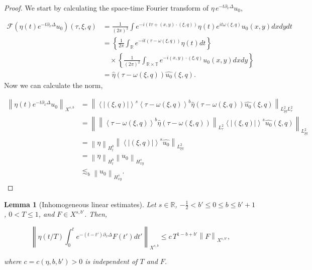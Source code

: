 \documentclass[12pt,oneside,reqno]{amsart}
\numberwithin{equation}{section}
\theoremstyle{plain}
\newtheorem{lemma}[theorem]{Lemma}
\def\R{{\mathbb R}}
\def\T{{\mathbb T}}
\newcommand{\norm}[1]{%
    \left\lVert #1\right\rVert%
}
\newcommand{\inp}[1]{%
    \left\langle #1\right\rangle
}
\newcommand{\brs}[1]{%
    \left\{#1\right\}
}
\def\pt{\partial}
\newcommand{\Lptxy}[3]{%
    \left\lVert #1\right\rVert_{L^{#2}_{#3}}%
}
\newcommand{\xnorm}[3]{%
    \left\lVert #1\right\rVert_{X^{{#2},{#3}}}%
}
\newcommand{\F}{\mathcal{F}}
\newcommand{\Fh}[1]{\widehat{#1}}
\newcommand{\sg}[1]{%
    e^{#1\partial_x\Delta}%
}
\begin{document}
\begin{proof}
    We start by calculating the space-time Fourier transform of $\eta\, \sg{-t} u_0$, 


    \begin{align*}
        \F {\left({\eta(t) \sg{-t} u_0}\right)}(\tau, \xi,q) &= \frac{1}{(2\pi)^3} \int e^{- i (t \tau + (x,y) \cdot (\xi,q))} \eta(t) e^{i t \omega(\xi,q)} u_0(x,y) dx dy dt\\
        & = \brs{ \frac{1}{2\pi} \int_\R e^{- i t (\tau - \omega(\xi,q))} \eta(t) dt}\\
        &\quad \times \brs{\frac{1}{(2 \pi)^2} \int_{\R \times \T} e^{- i (x,y)\cdot (\xi,q)} u_0(x,y) dx dy }\\
        &= \Fh{\eta} (\tau - \omega(\xi,q)) \Fh{u_0}(\xi,q).
    \end{align*}
Now we can calculate the norm,

\begin{align*}
    \xnorm{\eta(t) \sg{-t} {u_0}}{s}{b} &= \norm{\inp{|(\xi,q)|}^s \inp{\tau - \omega(\xi,q)}^b \Fh{\eta}(\tau -\omega(\xi,q)) \Fh{u_0}(\xi,q)}_{L_{\xi q}^2 L^2_\tau}\\
    &= \Lptxy{  \Lptxy{\inp{\tau -\omega(\xi,q)}^b \Fh{\eta}(\tau - \omega(\xi,q))}{2}{\tau} \inp{|(\xi,q)|}^s \Fh{u_0}(\xi,q)  }{2}{\xi q}\\
    &= \norm{\eta}_{H^b_t} \norm{\inp{|(\xi,q)|}^s \Fh{u_0}}_{L^2_{\xi q}}\\
    &= \norm{\eta}_{H^b_t} \norm{u_0}_{H^{s}_{xy}}\\
    & \lesssim_b \norm{u_0}_{H^{s}_{xy}}.
\end{align*}




    
\end{proof}



\begin{lemma}[Inhomogeneous linear estimates]
\label{lem:duhamel-linear-estimate}
Let $s\in\R$,
$-\frac12<b'\leq0\leq b\leq b'+1$,
$0<T\leq1$, and $F\in X^{s,b'}$. Then,

\begin{equation}
    \label{eq:duhamel-linear-estimate}
    \norm{\eta(t/T) \int_0^t e^{-(t-t')\pt_x \Delta} F(t') dt'}_{X^{s,b}} \le c\, T^{1-b+b'} \norm{F}_{X^{s,b'}},
\end{equation}

where $c=c(\eta,b,b')>0$ is independent of $T$ and $F$.
\end{lemma}
\end{document}
